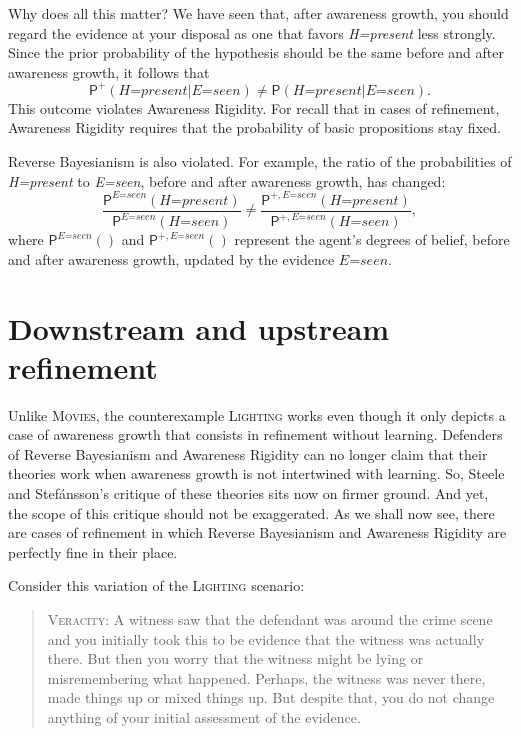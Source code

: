 \documentclass[
  11pt,
  dvipsnames,enabledeprecatedfontcommands]{scrartcl}
\newcommand{\pr}[1]{\ensuremath{\mathsf{P}(#1)}}
\newcommand{\ppr}[2]{\ensuremath{\mathsf{P}^{#1}(#2)}}
\begin{document}
Why does all this matter? We have seen that, after awareness growth, you
should regard the evidence at your disposal as one that favors
\textit{H=present} less strongly. Since the prior probability of the
hypothesis should be the same before and after awareness growth, it
follows that
\[\ppr{+}{\textit{H=present} \vert \textit{E=seen}} \neq \pr{\textit{H=present} \vert \textit{E=seen}}.\]
This outcome violates Awareness Rigidity. For recall that in cases of
refinement, Awareness Rigidity requires that the probability of basic
propositions stay fixed.

Reverse Bayesianism is also violated. For example, the ratio of the
probabilities of \textit{H=present} to \textit{E=seen}, before and after
awareness growth, has changed:
\[\frac{\ppr{\textit{E=seen}}{\textit{H=present}}}{\ppr{ \textit{E=seen}}{\textit{H=seen}}} \neq \frac{\ppr{+, \textit{E=seen}}{\textit{H=present}}}{\ppr{+, \textit{E=seen}}{\textit{H=seen}}},\]
where \(\ppr{\textit{E=seen}}{}\) and \(\ppr{+, \textit{E=seen}}{}\)
represent the agent's degrees of belief, before and after awareness
growth, updated by the evidence \(\textit{E=seen}\).

\hypertarget{downstream-and-upstream-refinement}{%
\section{Downstream and upstream
refinement}\label{downstream-and-upstream-refinement}}

\label{sec:downstream}

Unlike \textsc{Movies}, the counterexample \textsc{Lighting} works even
though it only depicts a case of awareness growth that consists in
refinement without learning. Defenders of Reverse Bayesianism and
Awareness Rigidity can no longer claim that their theories work when
awareness growth is not intertwined with learning. So, Steele and
Stefánsson's critique of these theories sits now on firmer ground. And
yet, the scope of this critique should not be exaggerated. As we shall
now see, there are cases of refinement in which Reverse Bayesianism and
Awareness Rigidity are perfectly fine in their place.

Consider this variation of the \textsc{Lighting} scenario:

\begin{quote}
\textsc{Veracity}: A witness saw that the defendant was around the crime
scene and you initially took this to be evidence that the witness was
actually there. But then you worry that the witness might be lying or
misremembering what happened. Perhaps, the witness was never there, made
things up or mixed things up. But despite that, you do not change
anything of your initial assessment of the evidence.
\end{quote}
\end{document}
